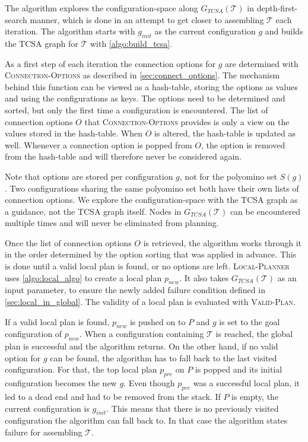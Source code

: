 The algorithm explores the configuration-space along $G_{\textit{TCSA}}(\mathcal{T})$ in depth-first-search manner, which is done in an attempt to get closer to assembling $\mathcal{T}$ each iteration.
The algorithm starts with $g_\textit{init}$ as the current configuration $g$ and builds the TCSA graph for $\mathcal{T}$ with \autoref{algo:build_tcsa}.

As a first step of each iteration the connection options for $g$ are determined with {\scshape Connection-Options} as described in \autoref{sec:connect_options}.
The mechanism behind this function can be viewed as a hash-table, storing the options as values and using the configurations as keys.
The options need to be determined and sorted, but only the first time a configuration is encountered.
The list of connection options $O$ that {\scshape Connection-Options} provides is only a view on the values stored in the hash-table.
When $O$ is altered, the hash-table is updated as well.
Whenever a connection option is popped from $O$, the option is removed from the hash-table and will therefore never be considered again.

Note that options are stored per configuration $g$, not for the polyomino set $S(g)$.
Two configurations sharing the same polyomino set both have their own lists of connection options.
We explore the configuration-space with the TCSA graph as a guidance, not the TCSA graph itself.
Nodes in $G_{\textit{TCSA}}(\mathcal{T})$ can be encountered multiple times and will never be eliminated from planning.

Once the list of connection options $O$ is retrieved, the algorithm works through it in the order determined by the option sorting that was applied in advance.
This is done until a valid local plan is found, or no options are left.
{\scshape Local-Planner} uses \autoref{algo:local_algo} to create a local plan $p_\textit{new}$.
It also takes $G_{\textit{TCSA}}(\mathcal{T})$ as an input parameter, to ensure the newly added failure condition defined in \autoref{sec:local_in_global}.
The validity of a local plan is evaluated with {\scshape Valid-Plan}.

If a valid local plan is found, $p_\textit{new}$ is pushed on to $P$ and $g$ is set to the goal configuration of $p_\textit{new}$.
When a configuration containing $\mathcal{T}$ is reached, the global plan is successful and the algorithm returns.
On the other hand, if no valid option for $g$ can be found, the algorithm has to fall back to the last visited configuration.
For that, the top local plan $p_\textit{pre}$ on $P$ is popped and its initial configuration becomes the new $g$.
Even though $p_\textit{pre}$ was a successful local plan, it led to a dead end and had to be removed from the stack.
If $P$ is empty, the current configuration is $g_\textit{init}$.
This means that there is no previously visited configuration the algorithm can fall back to.
In that case the algorithm states failure for assembling $\mathcal{T}$.

